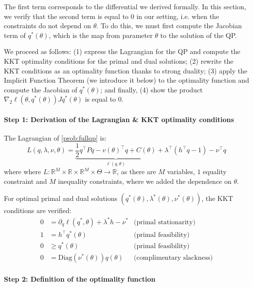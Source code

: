 The first term corresponds to the differential we derived formally. In this section, we verify that the second term is equal to $0$ in our setting, i.e. when the constraints do not depend on $\theta$. To do this, we must first compute the Jacobian term of $q^*(\theta)$, which is the map from parameter $\theta$ to the solution of the QP.

We proceed as follows: (1) express the Lagrangian for the QP and compute the KKT optimality conditions for the primal and dual solutions; (2) rewrite the KKT conditions as an optimality function thanks to strong duality; (3) apply the Implicit Function Theorem (we introduce it below) to the optimality function and compute the Jacobian of $q^*(\theta)$; and finally, (4) show the product $\nabla_2 \ell(\theta, q^*(\theta))J q^*(\theta)$ is equal to $0$.

\paragraph{Step 1: Derivation of the Lagrangian \& KKT optimality conditions}
The Lagrangian of \cref{prob:fullqp} is:
\begin{equation}
    L(q, \lambda, \nu, \theta) = \underbrace{\frac{1}{2}q^\top Pq - v(\theta)^\top q + C(\theta)}_{\ell(q, \theta)}+ \lambda^\top (h^\top q - 1) - \nu^\top q
\end{equation}
where
where $L: \mathbb R^M \times \mathbb R \times \mathbb R^M\times\Theta\to\mathbb R$, as there are $M$ variables, $1$ equality constraint and $M$ inequality constraints, where we added the dependence on $\theta$.

For optimal primal and dual solutions $(q^*(\theta), \lambda^*(\theta), \nu^*(\theta))$, the KKT conditions are verified:
\begin{align}
    0 &= \partial_q \ell(q^*, \theta) + \lambda^*h - \nu^* &\text{(primal stationarity)}\\
    1 & =h^\top q^*(\theta)  & \text{(primal feasibility)} \\
    0 & \geq q^*(\theta) & \text{(primal feasibility)}\\
    0 & = \mathrm{Diag}(\nu^*(\theta))q(\theta) & \text{(complimentary slackness)}
\end{align}


\paragraph{Step 2: Definition of the optimality function}

